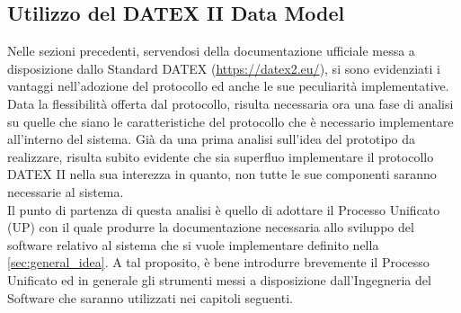 \subsection{Utilizzo del DATEX II Data Model}
Nelle sezioni precedenti, servendosi della documentazione ufficiale messa a disposizione dallo Standard DATEX (\url{https://datex2.eu/}), si sono evidenziati i vantaggi nell'adozione del protocollo ed anche le sue peculiarità implementative. Data la flessibilità offerta dal protocollo, risulta necessaria ora una fase di analisi su quelle che siano le caratteristiche del protocollo che è necessario implementare all'interno del sistema. Già da una prima analisi sull'idea del prototipo da realizzare, risulta subito evidente che sia superfluo implementare il protocollo DATEX II nella sua interezza in quanto, non tutte le sue componenti saranno necessarie al sistema. \\
Il punto di partenza di questa analisi è quello di adottare il Processo Unificato (UP) con il quale produrre la documentazione necessaria allo sviluppo del software relativo al sistema che si vuole implementare definito nella \autoref{sec:general_idea}. A tal proposito, è bene introdurre brevemente il Processo Unificato ed in generale gli strumenti messi a disposizione dall'Ingegneria del Software che saranno utilizzati nei capitoli seguenti.

